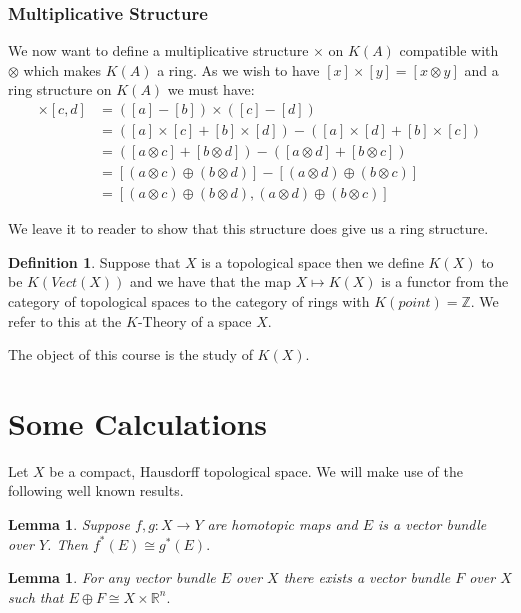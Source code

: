 \documentclass[a4paper,10pt]{article}
\theoremstyle{plain}%
\newtheorem{lem}[thm]{Lemma}
\theoremstyle{definition}
\newtheorem{defn}{Definition}
\theoremstyle{remark}
\newcommand{\ZZ}{\mathbb{Z}}
\newcommand{\RR}{\mathbb{R}}
\begin{document}
\subsubsection{Multiplicative Structure}

We now want to define a multiplicative structure $\times$ on $K(A)$ compatible with $\otimes$ which makes $K(A)$
a ring. As we wish to have $[x]\times[y]=[x\otimes y]$ and a ring structure on $K(A)$ we must have:
\begin{align*}
 [a,b]\times[c,d] &= ([a]-[b])\times([c]-[d])\\
		  &= ([a]\times[c]+[b]\times[d])-([a]\times[d]+[b]\times[c])\\
		  &= ([a\otimes c]+[b\otimes d])-([a\otimes d]+[b\otimes c])\\
		  &= [(a\otimes c)\oplus(b\otimes d)]-[(a\otimes d)\oplus(b\otimes c)]\\
		  &= [(a\otimes c)\oplus(b\otimes d),(a\otimes d)\oplus(b\otimes c)]
\end{align*}

We leave it to reader to show that this structure does give us a ring structure.

\begin{defn}
 Suppose that $X$ is a topological space then we define $K(X)$ to be $K(Vect(X))$ and we have that the map $X\mapsto K(X)$
is a functor from the category of topological spaces to the category of rings with $K(point)=\ZZ$. We refer to this at the $K$-Theory of a space $X$.
\end{defn}

The object of this course is the study of $K(X)$.

\section{Some Calculations}

Let $X$ be a compact, Hausdorff topological space. We will make use of the following well known results.

\begin{lem}\label{htpyiso}
Suppose $f,g:X\to Y$ are homotopic maps and $E$ is a vector bundle over $Y$. Then $f^*(E)\cong g^* (E).$
\end{lem}

\begin{lem}
For any vector bundle $E$ over $X$ there exists a vector bundle $F$ over $X$ such that $E\oplus F\cong X \times \RR^n.$ 
\end{lem}
\end{document}
